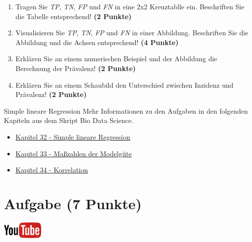 \documentclass[a4paper, 10pt]{scrartcl}\usepackage[]{graphicx}\usepackage[]{xcolor}
\begin{document}
\begin{enumerate}
\item Tragen Sie \textit{TP}, \textit{TN}, \textit{FP} und \textit{FN} in
  eine 2x2 Kreuztablle ein. Beschriften Sie die Tabelle entsprechend!
  \textbf{(2 Punkte)}
\item Visualisieren Sie \textit{TP}, \textit{TN}, \textit{FP} und
  \textit{FN} in einer Abbildung. Beschriften Sie die Abbildung und die
  Achsen entsprechend! \textbf{(4 Punkte)}
\item Erkl{\"a}ren Sie an einem numerischen Beispiel und der Abbildung die
  Berechnung der Pr{\"a}valenz!  \textbf{(2 Punkte)}
\item Erkl{\"a}ren Sie an einem Schaubild den Unterschied zwischen Inzidenz und
  Pr{\"a}valenz!  \textbf{(2 Punkte)}
\end{enumerate}





 
\clearpage
\begin{graybox}{Simple lineare Regression}
Mehr Informationen zu den Aufgaben in den folgenden Kapiteln aus dem Skript Bio Data Science.
  \begin{itemize}
  \item \href{https://jkruppa.github.io/stat-linear-reg-basic.html}{Kapitel 32 - Simple lineare Regression}
  \item \href{https://jkruppa.github.io/stat-linear-reg-quality.html}{Kapitel 33 - Maßzahlen der Modelgüte}
  \item \href{https://jkruppa.github.io/stat-linear-reg-corr.html}{Kapitel 34 - Korrelation}
  \end{itemize}
\end{graybox}
\clearpage

\section{Aufgabe \hfill (7 Punkte)}

\hfill\href{https://youtu.be/2dUJcYK9RgU}{\includegraphics[width =
  2cm]{img/youtube}}\\[1Ex]
\end{document}
